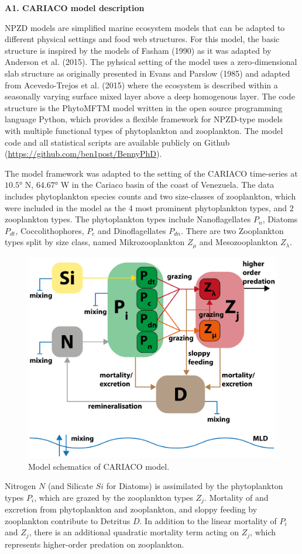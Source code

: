 \documentclass[11pt,letterpaper,english]{article}
\begin{document}
\newcommand{\etal}{{\em et al.}}
\newcommand{\ux}{{\underline{x}}}
\newcommand{\tdt}{{t}} 

{\bf {\large A1. CARIACO model description}} 

NPZD models are simplified marine ecosystem models that can be adapted to different physical settings and food web structures. For this model, the basic structure is inspired by the models of Fasham (1990) as it was adapted by Anderson et al. (2015). The pyhsical setting of the model uses a zero-dimensional slab structure as originally presented in Evans and Parslow (1985) and adapted from Acevedo-Trejos et al. (2015) where the ecosystem is described within a seasonally varying surface mixed layer above a deep homogenous layer. The code structure is the PhytoMFTM model written in the open source programming language Python, which provides a flexible framework for NPZD-type models with multiple functional types of phytoplankton and zooplankton. The model code and all statistical scripts are available publicly on Github (\url{https://github.com/ben1post/BennyPhD}).

The model framework was adapted to the setting of the CARIACO time-series at $10.5°$ N, $64.67°$ W in the Cariaco basin of the coast of Venezuela. The data includes phytoplankton species counts and two size-classes of zooplankton, which were included in the model as the 4 most prominent phytoplankton types, and 2 zooplankton types. The phytoplankton types include Nanoflagellates $P_{n}$, Diatoms $P_{dt}$, Coccolithophores, $P_{c}$ and Dinoflagellates $P_{dn}$. There are two Zooplankton types split by size class, named Mikrozooplankton $Z_{\mu}$ and Mesozooplankton $Z_{\lambda}$. 
\begin{figure}[b!]
\centering
  \includegraphics[width=0.7\linewidth]{images/whiteArtboard4ModelSchematics.png}
  \caption{Model schematics of CARIACO model.}
  \label{fig:boat1}
\end{figure}
Nitrogen $N$ (and Silicate $Si$ for Diatoms) is assimilated by the phytoplankton types $P_i$, which are grazed by the zooplankton types $Z_j$. Mortality of and excretion from phytoplankton and zooplankton, and sloppy feeding by zooplankton contribute to Detritus $D$. In addition to the linear mortality of $P_i$ and $Z_j$, there is an additional quadratic mortality term acting on $Z_j$, which represents higher-order predation on zooplankton.
\end{document}
